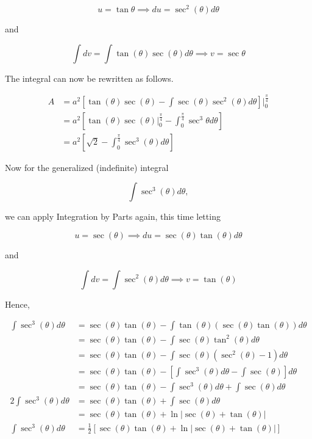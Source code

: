 \documentclass{article}
\begin{document}
    \[
        u = \tan{\theta} \implies du = \sec^2{(\theta)}d\theta
    \]

    and

    \[
        \int dv = \int \tan{(\theta)}\sec{(\theta)}d\theta \implies v = \sec{\theta}
    \]

    The integral can now be rewritten as follows.

    \begin{align*}
        A   &= a^2 \left[\tan{(\theta)}\sec{(\theta)}-\int \sec{(\theta)}\sec^2{(\theta)}d\theta\right]\Big|_0^{\frac{\pi}{4}} \\
            &= a^2 \left[\tan{(\theta)}\sec{(\theta)}\Big|_0^{\frac{\pi}{4}}-\int_0^{\frac{\pi}{4}}\sec^3{\theta}d\theta\right] \\
            &= a^2 \left[\sqrt{2}-\int_0^{\frac{\pi}{4}}\sec^3{(\theta)}d\theta\right]
    \end{align*}

    Now for the generalized (indefinite) integral

    \[
        \int\sec^3{(\theta)}d\theta,
    \]

    we can apply Integration by Parts again, this time letting

    \[
        u   = \sec{(\theta)} \implies du = \sec{(\theta)}\tan{(\theta)}d\theta
    \]

    and

    \[
        \int dv = \int \sec^2{(\theta)}d\theta \implies v = \tan{(\theta)}
    \]

    Hence,

    \begin{align*}
        \int\sec^3{(\theta)}d\theta     &= \sec{(\theta)}\tan{(\theta)} - \int \tan{(\theta)}\left(\sec{(\theta)\tan{(\theta)}}\right) d\theta \\
                                        &= \sec{(\theta)}\tan{(\theta)} - \int \sec{(\theta)}\tan^2{(\theta)}d\theta \\
                                        &= \sec{(\theta)}\tan{(\theta)} - \int \sec{(\theta)} \left(\sec^2{(\theta)}-1\right)d\theta \\
                                        &= \sec{(\theta)}\tan{(\theta)} - \left[\int \sec^3{(\theta)}d\theta - \int \sec{(\theta)}\right] d\theta \\
                                        &= \sec{(\theta)}\tan{(\theta)} - \int \sec^3{(\theta)} d\theta + \int \sec{(\theta)} d\theta \\
        2\int\sec^3{(\theta)}d\theta    &= \sec{(\theta)}\tan{(\theta)} + \int \sec{(\theta)}d\theta \\
                                        &= \sec{(\theta)}\tan{(\theta)} + \ln{\left|\sec{(\theta)}+\tan{(\theta)}\right|} \\
        \int\sec^3{(\theta)}d\theta     &= \frac{1}{2}\left[\sec{(\theta)}\tan{(\theta)} + \ln{\left|\sec{(\theta)}+\tan{(\theta)}\right|}\right]
    \end{align*}
\end{document}
